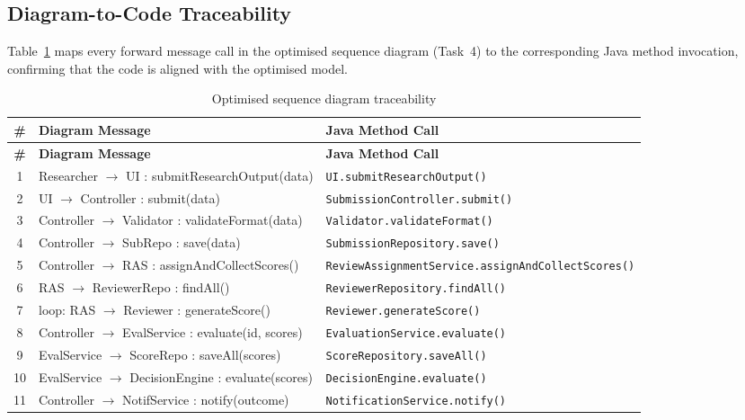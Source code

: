\documentclass[12pt, a4paper]{article}
\begin{document}
\subsection{Diagram-to-Code Traceability}

Table~\ref{tab:opt-traceability} maps every forward message call in the optimised sequence diagram (Task~4) to the corresponding Java method invocation, confirming that the code is aligned with the optimised model.

\begin{longtable}{c p{5.5cm} p{6.5cm}}
    \caption{Optimised sequence diagram traceability}
    \label{tab:opt-traceability} \\
    \toprule
    \textbf{\#} & \textbf{Diagram Message} & \textbf{Java Method Call} \\
    \midrule
    \endfirsthead
    \toprule
    \textbf{\#} & \textbf{Diagram Message} & \textbf{Java Method Call} \\
    \midrule
    \endhead
    1 & Researcher $\rightarrow$ UI : submitResearchOutput(data) & \texttt{UI.submitResearchOutput()} \\
    2 & UI $\rightarrow$ Controller : submit(data) & \texttt{SubmissionController.submit()} \\
    3 & Controller $\rightarrow$ Validator : validateFormat(data) & \texttt{Validator.validateFormat()} \\
    4 & Controller $\rightarrow$ SubRepo : save(data) & \texttt{SubmissionRepository.save()} \\
    5 & Controller $\rightarrow$ RAS : assignAndCollectScores() & \texttt{ReviewAssignmentService.assignAndCollectScores()} \\
    6 & RAS $\rightarrow$ ReviewerRepo : findAll() & \texttt{ReviewerRepository.findAll()} \\
    7 & loop: RAS $\rightarrow$ Reviewer : generateScore() & \texttt{Reviewer.generateScore()} \\
    8 & Controller $\rightarrow$ EvalService : evaluate(id, scores) & \texttt{EvaluationService.evaluate()} \\
    9 & EvalService $\rightarrow$ ScoreRepo : saveAll(scores) & \texttt{ScoreRepository.saveAll()} \\
    10 & EvalService $\rightarrow$ DecisionEngine : evaluate(scores) & \texttt{DecisionEngine.evaluate()} \\
    11 & Controller $\rightarrow$ NotifService : notify(outcome) & \texttt{NotificationService.notify()} \\
    \bottomrule
\end{longtable}
\end{document}
